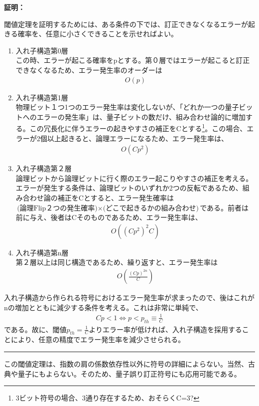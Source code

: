\documentclass[a4paper,10.5pt]{article}
\numberwithin{equation}{section}
\newenvironment{proofbox}
{\begin{prooflabel}\textbf{証明：}\end{prooflabel}\vspace{0.8em}}
{\par\vspace{1em}\hrule\vspace{1em}}
\begin{document}
\begin{proofbox}
    閾値定理を証明するためには、ある条件の下では、訂正できなくなるエラーが起きる確率を、任意に小さくできることを示せればよい。
    \begin{enumerate}
        \item 入れ子構造第0層\\
       この時、エラーが起こる確率をpとする。第０層ではエラーが起こると訂正できなくなるため、エラー発生率のオーダーは
       \begin{align*}
           O(p)
       \end{align*}
       \item 入れ子構造第1層\\
       物理ビット１つ1つのエラー発生率は変化しないが、「どれか一つの量子ビットへのエラーの発生率」は、量子ビットの数だけ、組み合わせ論的に増加する。この冗長化に伴うエラーの起きやすさの補正をCとする\footnote{3ビット符号の場合、3通り存在するため、おそらくC=3?}。この場合、エラーが2個以上起きると、論理エラーになるため、エラー発生率は、
       \begin{align*}
           O(Cp^{2})
       \end{align*}
       \item 入れ子構造第２層\\
       論理ビットから論理ビットに行く際のエラー起こりやすさの補正を考える。\\
       エラーが発生する条件は、論理ビットのいずれか2つの反転であるため、組み合わせ論の補正をCとすると、エラー発生確率は$\text{(論理Flip２つの発生確率)}\times\text{(どこで起きるかの組み合わせ)}$である。前者は前に与え、後者はCそのものであるため、エラー発生率は、
       \begin{align*}
           O((Cp^{2})^{2}C)
       \end{align*}
       \item 入れ子構造第n層\\
       第２層以上は同じ構造であるため、繰り返すと、エラー発生率は
       \begin{align*}
           O(\frac{(Cp)^{2n}}{C})
       \end{align*}
    \end{enumerate}
    入れ子構造から作られる符号におけるエラー発生率が求まったので、後はこれがnの増加とともに減少する条件を考える。これは非常に単純で、
    \begin{align*}
        Cp<1 \iff p<p_{th}\equiv \frac{1}{C}
    \end{align*}
    である。故に、閾値$p_{th}=\frac{1}{C}$よりエラー率が低ければ、入れ子構造を採用することにより、任意の精度でエラー発生率を減少させられる。
\end{proofbox}
この閾値定理は、指数の肩の係数依存性以外に符号の詳細によらない。当然、古典や量子にもよらない。そのため、量子誤り訂正符号にも応用可能である。
\end{document}
